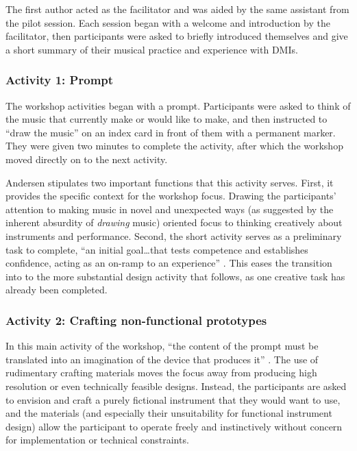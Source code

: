 \documentclass[letterpaper, 12pt]{article}
\begin{document}
The first author acted as the facilitator and was aided by the same assistant from the pilot session. Each session began with a welcome and introduction by the facilitator, then participants were asked to briefly introduced themselves and give a short summary of their musical practice and experience with DMIs. 

\subsubsection{Activity 1: Prompt}
\label{sec:activity-1-prompt}

The workshop activities began with a prompt. Participants were asked to think of the music that currently make or would like to make, and then instructed to ``draw the music'' on an index card in front of them with a permanent marker. They were given two minutes to complete the activity, after which the workshop moved directly on to the next activity.

Andersen stipulates two important functions that this activity serves. First, it provides the specific context for the workshop focus. 
Drawing the participants' attention to making music in novel and unexpected ways (as suggested by the inherent absurdity of \emph{drawing} music) oriented focus to thinking creatively about instruments and performance. Second, the short activity serves as a preliminary task to complete, ``an initial goal\ldots that tests competence and establishes confidence, acting as an on-ramp to an experience'' \citep[p. 5]{Andersen2019}. This eases the transition into to the more substantial design activity that follows, as one creative task has already been completed. 

\subsubsection{Activity 2: Crafting non-functional prototypes}
\label{sec:activity-2-crafting-non-functional-prototypes}

In this main activity of the workshop, ``the content of the prompt must be translated into an imagination of the device that produces it'' \citep[p. 5]{Andersen2019}. The use of rudimentary crafting materials moves the focus away from producing high resolution or even technically feasible designs. Instead, the participants are asked to envision and craft a purely fictional instrument that they would want to use, and the materials (and especially their unsuitability for functional instrument design) allow the participant to operate freely and instinctively without concern for implementation or technical constraints.
\end{document}
